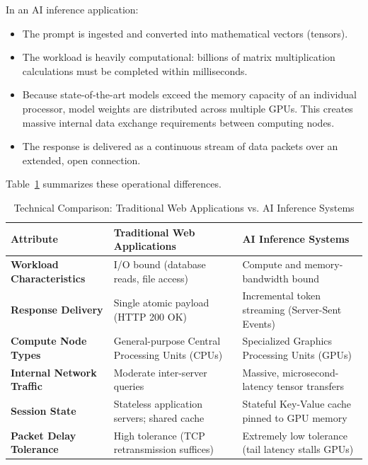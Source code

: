 \documentclass[12pt,a4paper]{report}
\begin{document}
In an AI inference application:
\begin{itemize}[leftmargin=1.2cm]
    \item The prompt is ingested and converted into mathematical vectors (tensors).
    \item The workload is heavily computational: billions of matrix multiplication calculations must be completed within milliseconds.
    \item Because state-of-the-art models exceed the memory capacity of an individual processor, model weights are distributed across multiple GPUs. This creates massive internal data exchange requirements between computing nodes.
    \item The response is delivered as a continuous stream of data packets over an extended, open connection.
\end{itemize}

Table~\ref{tab:comparison_web_ai} summarizes these operational differences.

\begin{table}[H]
\centering
\caption{Technical Comparison: Traditional Web Applications vs. AI Inference Systems}
\label{tab:comparison_web_ai}
\begin{tabularx}{\textwidth}{lXX}
\toprule
\textbf{Attribute} & \textbf{Traditional Web Applications} & \textbf{AI Inference Systems} \\
\midrule
\textbf{Workload Characteristics} & I/O bound (database reads, file access) & Compute and memory-bandwidth bound \\
\textbf{Response Delivery} & Single atomic payload (HTTP 200 OK) & Incremental token streaming (Server-Sent Events) \\
\textbf{Compute Node Types} & General-purpose Central Processing Units (CPUs) & Specialized Graphics Processing Units (GPUs) \\
\textbf{Internal Network Traffic} & Moderate inter-server queries & Massive, microsecond-latency tensor transfers \\
\textbf{Session State} & Stateless application servers; shared cache & Stateful Key-Value cache pinned to GPU memory \\
\textbf{Packet Delay Tolerance} & High tolerance (TCP retransmission suffices) & Extremely low tolerance (tail latency stalls GPUs) \\
\bottomrule
\end{tabularx}
\end{table}
\end{document}
